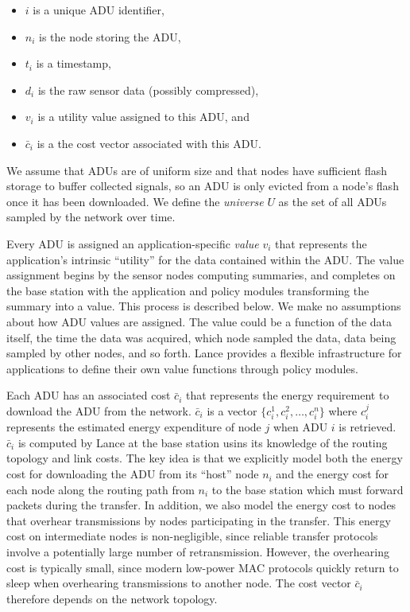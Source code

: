 \begin{itemize}

\item $i$ is a unique ADU identifier,

\item $n_i$ is the node storing the ADU,

\item $t_i$ is a timestamp,

\item $d_i$ is the raw sensor data (possibly compressed),

\item $v_i$ is a utility value assigned to this ADU, and

\item $\bar{c}_i$ is a the cost vector associated with this ADU.

\end{itemize}

We assume that ADUs are of uniform size and that nodes have sufficient flash
storage to buffer collected signals, so an ADU is only evicted from a node's
flash once it has been downloaded. We define the \textit{universe} $U$ as the
set of all ADUs sampled by the network over time.

Every ADU is assigned an application-specific \textit{value} $v_i$ that
represents the application's intrinsic ``utility'' for the data contained
within the ADU. The value assignment begins by the sensor nodes computing
summaries, and completes on the base station with the application and policy
modules transforming the summary into a value. This process is described
below. We make no assumptions about how ADU values are assigned. The value
could be a function of the data itself, the time the data was acquired, which
node sampled the data, data being sampled by other nodes, and so forth.
Lance provides a flexible infrastructure for applications to define their own
value functions through policy modules.

Each ADU has an associated cost $\bar{c}_i$ that represents the energy
requirement to download the ADU from the network. $\bar{c}_i$ is a vector $\{
c_i^1, c_i^2, \ldots, c_i^n \}$ where $c_i^j$ represents the estimated energy
expenditure of node $j$ when ADU $i$ is retrieved. $\bar{c}_i$ is computed by
Lance at the base station usins its knowledge of the routing topology and
link costs. The key idea is that we explicitly model both the energy cost for
downloading the ADU from its ``host'' node $n_i$ and the energy cost for each
node along the routing path from $n_i$ to the base station which must forward
packets during the transfer. In addition, we also model the energy cost to
nodes that overhear transmissions by nodes participating in the transfer.
This energy cost on intermediate nodes is non-negligible, since reliable
transfer protocols involve a potentially large number of retransmission.
However, the overhearing cost is typically small, since modern low-power MAC
protocols quickly return to sleep when overhearing transmissions to another
node. The cost vector $\bar{c}_i$ therefore depends on the network topology.

